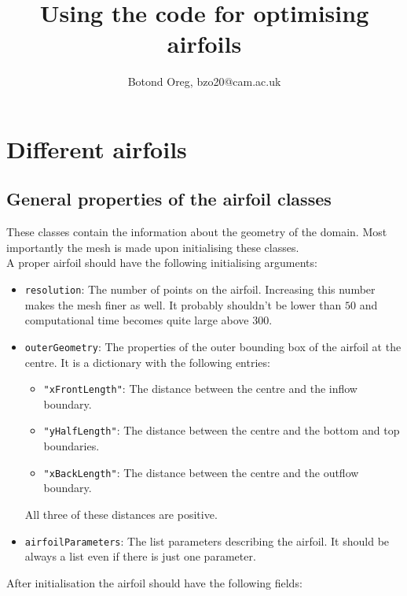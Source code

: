 \documentclass[12pt, a4paper]{article}
\begin{document}
    \title{Using the code for optimising airfoils}
    \author{Botond Oreg, bzo20@cam.ac.uk}
    \maketitle
    \section{Different airfoils}
        \subsection{General properties of the airfoil classes}
            These classes contain the information about the geometry of the domain. Most importantly the mesh is made upon initialising these classes. \\
            A proper airfoil should have the following initialising arguments:
            \begin{itemize}
                \item \texttt{resolution}: The number of points on the airfoil. Increasing this number makes the mesh finer as well. It probably shouldn't be lower than $50$ and computational time becomes quite large above $300$.
                \item \texttt{outerGeometry}: The properties of the outer bounding box of the airfoil at the centre. It is a dictionary with the following entries:
                \begin{itemize}
                    \item \texttt{"xFrontLength"}: The distance between the centre and the inflow boundary.
                    \item \texttt{"yHalfLength"}: The distance between the centre and the bottom and top boundaries.
                    \item \texttt{"xBackLength"}: The distance between the centre and the outflow boundary.
                \end{itemize}
                All three of these distances are positive.
                \item \texttt{airfoilParameters}: The list parameters describing the airfoil. It should be always a list even if there is just one parameter.
            \end{itemize}
            After initialisation the airfoil should have the following fields:
\end{document}
